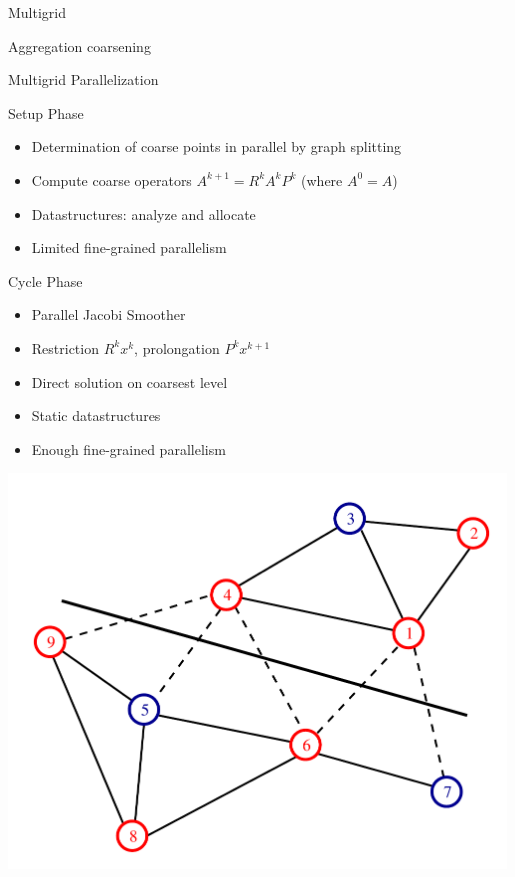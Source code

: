 \begin{frame}{Multigrid}
\begin{minipage}{0.48\textwidth}
\begin{center}
    Aggregation coarsening
  \end{center}
 \end{minipage}
 \vspace*{.5cm}
\end{frame}


\begin{frame}{Multigrid Parallelization}

 \begin{block}{Setup Phase}
  \begin{itemize}
   \item Determination of coarse points in parallel by graph splitting
   \item Compute coarse operators $A^{k+1} = R^k A^k P^k$ (where $A^0 = A$)
   \item Datastructures: analyze and allocate
   \item Limited fine-grained parallelism
  \end{itemize}
 \end{block}

 \begin{minipage}{0.58\textwidth}
 \begin{block}{Cycle Phase}
  \begin{itemize}
   \item Parallel Jacobi Smoother
   \item Restriction $R^k x^k$, prolongation $P^k x^{k+1}$
   \item Direct solution on coarsest level
   \item Static datastructures
   \item Enough fine-grained parallelism
  \end{itemize}
 \end{block}
 \end{minipage}
 \begin{minipage}{0.4\textwidth} \vspace*{-1.5cm}
  \includegraphics[width=0.99\textwidth]{figures/graph-rs0.pdf}
 \end{minipage}

 \vspace*{0.5cm}

\end{frame}
